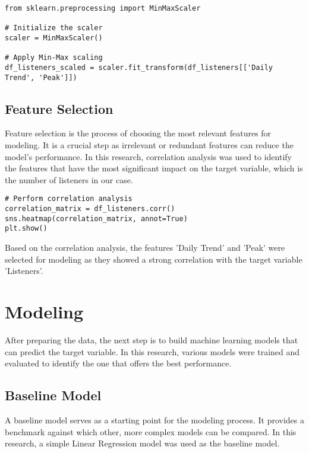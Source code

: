 \documentclass[12pt]{article}
\begin{document}
\begin{lstlisting}
from sklearn.preprocessing import MinMaxScaler

# Initialize the scaler
scaler = MinMaxScaler()

# Apply Min-Max scaling
df_listeners_scaled = scaler.fit_transform(df_listeners[['Daily Trend', 'Peak']])
\end{lstlisting}

\subsection{Feature Selection}

Feature selection is the process of choosing the most relevant features for modeling. It is a crucial step as irrelevant or redundant features can reduce the model's performance. In this research, correlation analysis was used to identify the features that have the most significant impact on the target variable, which is the number of listeners in our case.

\begin{lstlisting}
# Perform correlation analysis
correlation_matrix = df_listeners.corr()
sns.heatmap(correlation_matrix, annot=True)
plt.show()
\end{lstlisting}

Based on the correlation analysis, the features 'Daily Trend' and 'Peak' were selected for modeling as they showed a strong correlation with the target variable 'Listeners'.

\newpage

\section{Modeling}

After preparing the data, the next step is to build machine learning models that can predict the target variable. In this research, various models were trained and evaluated to identify the one that offers the best performance.

\subsection{Baseline Model}

A baseline model serves as a starting point for the modeling process. It provides a benchmark against which other, more complex models can be compared. In this research, a simple Linear Regression model was used as the baseline model.
\end{document}
